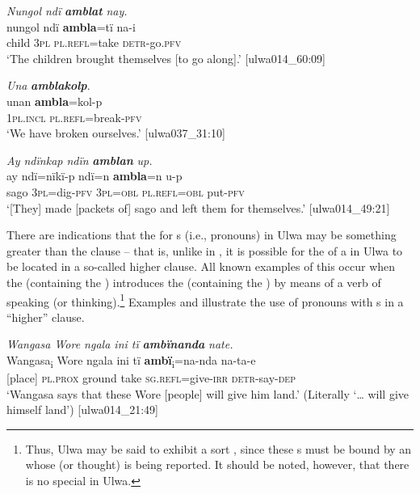 \ea%
    \label{ex:pron:20}
          \textit{Nungol ndï} \textbf{\textit{amblat}} \textit{nay.}\\
\gll    nungol  ndï  \textbf{ambla}=tï    na-i\\
    child  \textsc{3pl}  \textsc{pl.refl}=take  \textsc{detr-}go.\textsc{pfv}\\
\glt `The children brought themselves [to go along].’ [ulwa014\_60:09]
\z

\ea%
    \label{ex:pron:21}
          \textit{Una} \textbf{\textit{amblakolp}}.\\
\gll unan    \textbf{ambla}=kol-p\\
    1\textsc{pl.incl}  \textsc{pl.refl}=break-\textsc{pfv}\\
\glt `We have broken ourselves.’ [ulwa037\_31:10]
\z

\ea%
    \label{ex:pron:22}
          \textit{Ay ndïnkap ndïn} \textbf{\textit{amblan}} \textit{up.}\\
\gll    ay    ndï=nïkï{}-p    ndï=n    \textbf{ambla}=n    u-p\\
    sago  3\textsc{pl}=dig{}-\textsc{pfv}  \textsc{3pl=obl}  \textsc{pl.refl=obl}  put-\textsc{pfv}\\
\glt `[They] made [packets of] sago and left them for themselves.’ [ulwa014\_49:21]
\z

There are indications that the   for s (i.e.,  pronouns) in Ulwa may be something greater than the clause -- that is, unlike in , it is possible for the  of a   in Ulwa to be located in a so-called higher clause. All known examples of this occur when the  (containing the ) introduces the  (containing the  ) by means of a verb of speaking (or thinking).\footnote{Thus, Ulwa may be said to exhibit a sort , since these s must be bound by an  whose  (or thought) is being reported. It should be noted, however, that there is no special  in Ulwa.} Examples  and  illustrate the use of  pronouns with s in a “higher” clause.

\ea%
    \label{ex:pron:23}
          \textit{Wangasa Wore ngala ini tï} \textbf{\textit{ambïnanda}} \textit{nate.}\\
\gll    Wangasa\textsubscript{i}  Wore  ngala    ini    tï    \textbf{ambï}\textsubscript{i}=na-nda na-ta-e\\
    [name]    [place]  \textsc{pl.prox}  ground  take   \textsc{sg.refl}=give-\textsc{irr}    \textsc{detr}{}-say-\textsc{dep}\\
\glt `Wangasa says that these Wore [people] will give him land.’ (Literally ‘… will give himself land’) [ulwa014\_21:49]
\z

